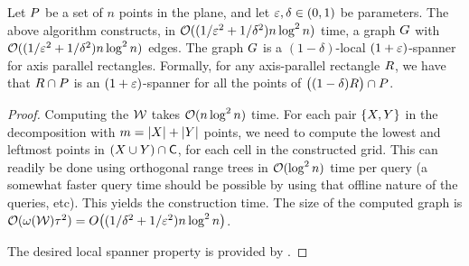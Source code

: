 \documentclass[12pt]{article}%
\begin{document}
\begin{theorem}
    Let $P$ be a set of $n$ points in the plane, and let
    $\varepsilon, \delta \in (0,1)$ be parameters. The above algorithm
    constructs, in $\mathcal{O}((1/\varepsilon^2 + 1/\delta^2) n \log^2 n)$ time, a
    graph $G$ with $\mathcal{O}((1/\varepsilon^2 + 1/\delta^2) n \log^2 n)$
    edges. The graph $G$ is a $(1-\delta)$-local $(1+\varepsilon)$-spanner
    for axis parallel rectangles. Formally, for any axis-parallel
    rectangle $R$, we have that $R \cap P$ is an
    $(1+\varepsilon)$-spanner for all the points of
    $\bigl((1-\delta)R \bigr)\cap P$.
\end{theorem}
\begin{proof}
    Computing the \QSPD $\mathcal{W}$ takes $\mathcal{O}(n \log^2 n)$ time. For each
    pair $\{X, Y\}$ in the decomposition with
    $m = |X| + |Y|$ points, we need to compute the lowest and
    leftmost points in $(X \cup Y) \cap \mathsf{C}$, for each cell in
    the constructed grid. This can readily be done using orthogonal
    range trees in $\mathcal{O}( \log^2 n)$ time per query (a somewhat faster
    query time should be possible by using that offline nature of the
    queries, etc). This yields the construction time. The size of the
    computed graph is
    $\Of(\WeightX{\WS} \gConst^2) = O\bigl((1/\delta^2 + 1/\eps^2) n
    \log^2 n\bigr)$.

    The desired local spanner property is provided by
    .
\end{proof}









% 

\end{document}
